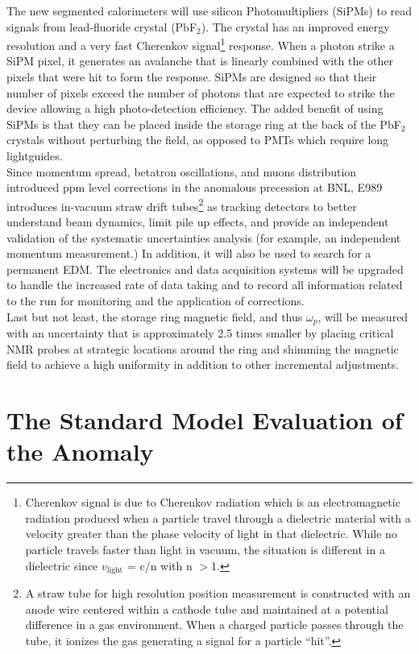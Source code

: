 \documentclass{outhesis}
\begin{document}
The new segmented calorimeters will use silicon Photomultipliers (SiPMs) to read signals from lead-fluoride crystal (PbF$_2$). The crystal has an improved energy resolution and a very fast Cherenkov signal\footnote{Cherenkov signal is due to Cherenkov radiation which is an electromagnetic radiation produced when a particle travel through a dielectric material with a velocity greater than the phase velocity of light in that dielectric. While no particle travels faster than light in vacuum, the situation is different in a dielectric since $v_\text{light}$ = c/n with n $>$1.} response. When a photon strike a SiPM pixel, it generates an avalanche that is linearly combined with the other pixels that were hit to form the response. SiPMs are designed so that their number of pixels exceed the number of photons that are expected to strike the device allowing a high photo-detection efficiency. The added benefit of using SiPMs is that they can be placed inside the storage ring at the back of the PbF$_2$ crystals without perturbing the field, as opposed to PMTs which require long lightguides. \\
Since momentum spread, betatron oscillations, and muons distribution introduced ppm level corrections in the anomalous precession at BNL, E989 introduces in-vacuum straw drift tubes\footnote{A straw tube for high resolution position measurement is constructed with an anode wire centered within a cathode tube and maintained at a potential difference in a gas environment.  When a charged particle passes through the tube, it ionizes the gas generating a signal for a particle ``hit''. } as tracking detectors to better understand beam dynamics, limit pile up effects, and provide an independent validation of the systematic uncertainties analysis (for example, an independent momentum measurement.) In addition, it will also be used to search for a permanent EDM. The electronics and data acquisition systems will be upgraded to handle the increased rate of data taking and to record all information related to the run for monitoring and the application of corrections. \\
Last but not least, the storage ring magnetic field, and thus $\omega_p$, will be measured with an uncertainty that is approximately 2.5 times smaller by placing critical NMR probes at strategic locations around the ring and shimming the magnetic field to achieve a high uniformity in addition to other incremental adjustments. 


\section{The Standard Model Evaluation of the Anomaly}
\label{sm}
\end{document}
